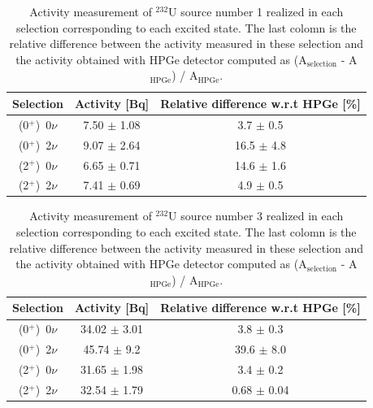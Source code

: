 \documentclass[main.tex]{subfiles}
\begin{document}
\begin{table}
\centering
\begin{tabular}{c|c|c}
Selection      & Activity [Bq]   & Relative difference w.r.t HPGe [\%] \\[0.1cm]
\hline
(0$^+$)~0$\nu$ & 7.50 $\pm$ 1.08 & 3.7 $\pm$ 0.5 \\[0.1cm]
\hline
(0$^+$)~2$\nu$ & 9.07 $\pm$ 2.64 & 16.5 $\pm$ 4.8 \\[0.1cm]
\hline
(2$^+$)~0$\nu$ & 6.65 $\pm$ 0.71 & 14.6 $\pm$ 1.6 \\[0.1cm]
\hline
(2$^+$)~2$\nu$ & 7.41 $\pm$ 0.69 & 4.9 $\pm$ 0.5 \\[0.1cm]
\end{tabular}
\caption{Activity measurement of $^{\text{232}}$U source number 1 realized in each selection corresponding to each excited state. The last colomn is the relative difference between the activity measured in these selection and the activity obtained with HPGe detector computed as (A$_{\text{selection}}$ - A$_{\text{HPGe}}$) / A$_{\text{HPGe}}$.}
\label{tab:ComparaisonActivitySource1}
\end{table}


\bigskip


\begin{table}
\centering
\begin{tabular}{c|c|c}
Selection      & Activity [Bq]   & Relative difference w.r.t HPGe [\%] \\[0.1cm]
\hline
(0$^+$)~0$\nu$ & 34.02 $\pm$ 3.01 & 3.8 $\pm$ 0.3 \\[0.1cm]
\hline
(0$^+$)~2$\nu$ & 45.74 $\pm$ 9.2 & 39.6 $\pm$ 8.0 \\[0.1cm]
\hline
(2$^+$)~0$\nu$ & 31.65 $\pm$ 1.98 & 3.4 $\pm$ 0.2 \\[0.1cm]
\hline
(2$^+$)~2$\nu$ & 32.54 $\pm$ 1.79 & 0.68 $\pm$ 0.04 \\[0.1cm]
\end{tabular}
\caption{Activity measurement of $^{\text{232}}$U source number 3 realized in each selection corresponding to each excited state. The last colomn is the relative difference between the activity measured in these selection and the activity obtained with HPGe detector computed as (A$_{\text{selection}}$ - A$_{\text{HPGe}}$) / A$_{\text{HPGe}}$.}
\label{tab:ComparaisonActivitySource3}
\end{table}
\end{document}
